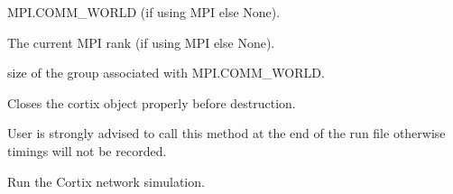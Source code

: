 \documentclass[letterpaper,10pt,openany,oneside,english]{sphinxmanual}
\begin{document}
\begin{fulllineitems}
\begin{fulllineitems}

\begin{fulllineitems}
\label{\detokenize{src_rst/cortix_main:cortix_main.Cortix.comm}}
 \textendash{} MPI.COMM\_WORLD (if using MPI else None).

\end{fulllineitems}


\begin{fulllineitems}
\label{\detokenize{src_rst/cortix_main:cortix_main.Cortix.rank}}
 \textendash{} The current MPI rank (if using MPI else None).

\end{fulllineitems}


\begin{fulllineitems}
\label{\detokenize{src_rst/cortix_main:cortix_main.Cortix.size}}
 \textendash{} size of the group associated with MPI.COMM\_WORLD.

\end{fulllineitems}


\end{fulllineitems}


\begin{fulllineitems}
\label{\detokenize{src_rst/cortix_main:cortix_main.Cortix.close}}
Closes the cortix object properly before destruction.

User is strongly advised to call this method at the end of the run file otherwise
timings will not be recorded.

\end{fulllineitems}


\begin{fulllineitems}
\end{fulllineitems}


\begin{fulllineitems}
\label{\detokenize{src_rst/cortix_main:cortix_main.Cortix.run}}
Run the Cortix network simulation.

\end{fulllineitems}


\end{fulllineitems}
\end{document}
